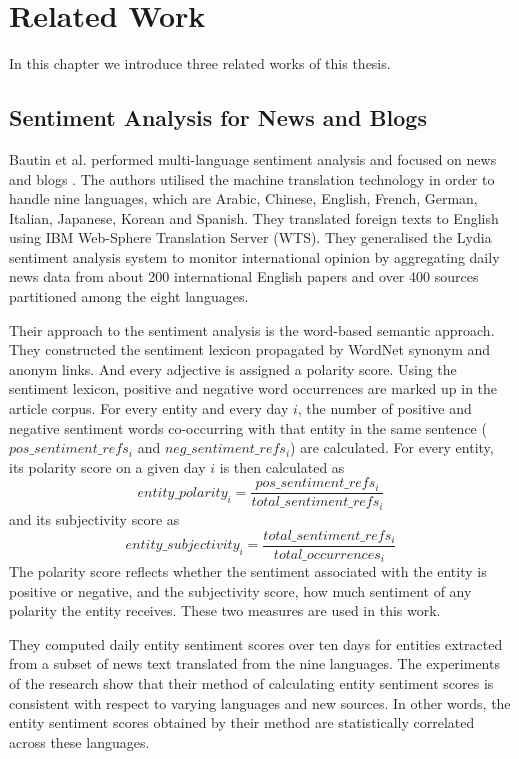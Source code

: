 \chapter{Related Work}
In this chapter we introduce three related works of this thesis.
\section{Sentiment Analysis for News and Blogs}
Bautin et al. performed multi-language sentiment analysis and focused on news and blogs \cite{news_blogs}.
The authors utilised the machine translation technology in order to handle nine languages, which are Arabic, Chinese, English, French, German, Italian, Japanese, Korean and Spanish.
They translated foreign texts to English using IBM Web-Sphere Translation Server (WTS).
They generalised the Lydia sentiment analysis system \cite{lydia} to monitor international opinion by aggregating daily news data from about 200 international English papers and over 400 sources partitioned among the eight languages. 

Their approach to the sentiment analysis is the word-based semantic approach.
They constructed the sentiment lexicon propagated by WordNet \cite{wordnet} synonym and anonym links.
And every adjective is assigned a polarity score.
Using the sentiment lexicon, positive and negative word occurrences are marked up in the article corpus.
For every entity and every day $i$, the number of positive and negative sentiment words co-occurring with that entity in the same sentence ($pos\_sentiment\_refs_i$ and $neg\_sentiment\_refs_i$) are calculated.
For every entity, its polarity score on a given day $i$ is then calculated as 
\begin{equation}
entity\_polarity_i = \frac{pos\_sentiment\_refs_i}{total\_sentiment\_refs_i}
\end{equation}
and its subjectivity score as 
\begin{equation}
entity\_subjectivity_i = \frac{total\_sentiment\_refs_i}{total\_occurrences_i}
\end{equation}
The polarity score reflects whether the sentiment associated with the entity is positive or negative, and the subjectivity score, how much sentiment of any polarity the entity receives.
These two measures are used in this work.

They computed daily entity sentiment scores over ten days for entities extracted from a subset of news text translated from the nine languages.
The experiments of the research show that their method of calculating entity sentiment scores is consistent with respect to varying languages and new sources.
In other words, the entity sentiment scores obtained by their method are statistically correlated across these languages.

